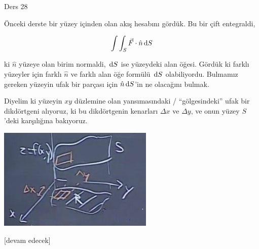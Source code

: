 \documentclass[12pt,fleqn]{article}\usepackage{../../common}
\begin{document}
Ders 28

Önceki derste bir yüzey içinden olan akış hesabını gördük. Bu bir çift
entegraldi,

$$
\int \int_S \vec{F} \cdot \hat{n} \,\mathrm{d} S
$$

ki $\hat{n}$ yüzeye olan birim normaldi, $\,\mathrm{d} S$ ise yüzeydeki alan öğesi.
Gördük ki farklı yüzeyler için farklı $\hat{n}$ ve farklı alan öğe formülü
$\,\mathrm{d} S$ olabiliyordu. Bulmamız gereken yüzeyin ufak bir parçası için
$\hat{n} \,\mathrm{d} S$'in ne olacağını bulmak.

Diyelim ki yüzeyin $xy$ düzlemine olan yansımasındaki / ``gölgesindeki'' ufak
bir dikdörtgeni alıyoruz, ki bu dikdörtgenin kenarları $\Delta x$ ve $\Delta y$,
ve onun yüzey $S$'deki karşılığına bakıyoruz.

\includegraphics[width=20em]{calc_multi_28_01.png}












[devam edecek]
\end{document}
